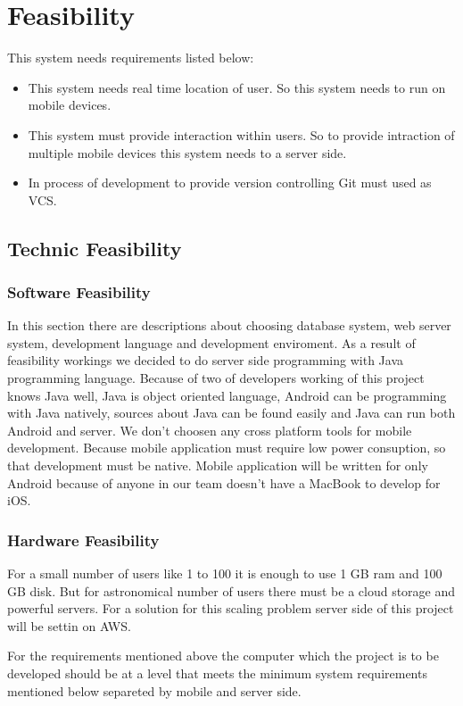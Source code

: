 \chapter{Feasibility}
This system needs requirements listed below:
\begin{itemize}
    \item This system needs real time location of user. So this system needs to run on mobile devices.
    \item This system must provide interaction within users. So to provide intraction of multiple mobile devices this system needs to a server side.
    \item In process of development to provide version controlling Git must used as VCS.
\end{itemize}

\section{Technic Feasibility}
\subsection{Software Feasibility}
In this section there are descriptions about choosing database system, web server system, development language and development enviroment.
As a result of feasibility workings we decided to do server side programming with Java programming language. Because of two of developers working of this project knows Java well, Java is object oriented language, Android can be programming with Java natively, sources about Java can be found easily and Java can run both Android and server.
We don't choosen any cross platform tools for mobile development. Because mobile application must require low power consuption, so that development must be native.
Mobile application will be written for only Android because of anyone in our team doesn't have a MacBook to develop for iOS.

\subsection{Hardware Feasibility}
For a small number of users like 1 to 100 it is enough to use 1 GB ram and 100 GB disk. But for astronomical number of users there must be a cloud storage and powerful servers. For a solution for this scaling problem server side of this project will be settin on AWS.


For the requirements mentioned above the computer which the project is to be developed should be at a level that meets the minimum system requirements mentioned below separeted by mobile and server side.

